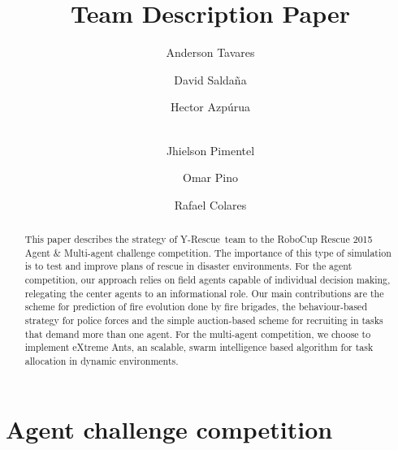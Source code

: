 \documentclass[runningheads,a4paper]{llncs}
\title{\teamname Team Description Paper}
\author{Anderson Tavares \and David Saldaña \and Hector Azpúrua \and\\ Jhielson Pimentel \and Omar Pino \and Rafael Colares}
\newcommand{\teamname}{Y-Rescue~}
\begin{document}
\titlerunning{\teamname TDP}



\maketitle

\begin{abstract}
This paper describes the strategy of \teamname team to the RoboCup Rescue 2015 Agent \& Multi-agent challenge competition. The importance of this type of simulation is to test and improve plans of rescue in disaster environments. 
For the agent competition, our approach relies on field agents capable of individual decision making, relegating the center agents to an informational role. Our main contributions are the scheme for prediction of fire evolution done by fire brigades, the behaviour-based strategy for police forces and the simple auction-based scheme for recruiting in tasks that demand more than one agent. For the multi-agent competition, we choose to implement eXtreme Ants, an scalable, swarm intelligence based algorithm for task allocation in dynamic environments.
\end{abstract}




\section{Agent challenge competition}
\label{sec:strategies}






















\end{document}
